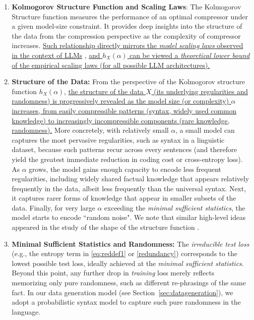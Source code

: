 \documentclass[11pt]{article}
\theoremstyle{plain}
\theoremstyle{definition}
\begin{document}
\begin{enumerate}
\item 
\noindent
{\bf  Kolmogorov Structure Function and Scaling Laws}:  
The Kolmogorov Structure function measures the performance of an optimal compressor under a given model-size constraint. It provides deep insights into the structure of the data from the compression perspective as the complexity of compressor increases. 
\uline{Such relationship directly mirrors the {\em model scaling laws} observed in the context of LLMs} \citep{kaplan2020scaling,hoffmann2022training}, \uline{and $h_X(\alpha)$ can be viewed a {\em theoretical lower bound} 
of the empirical scaling laws (for all possible LLM architectures).}


\item 
{\bf Structure of the Data:}  
From the perspective of the Kolmogorov structure function \(h_X(\alpha)\), 
\uline{the structure of the data $X$ (its underlying regularities and randomness)
is progressively revealed as the model size (or complexity) $\alpha$ increases, from easily compressible patterns (syntax, widely used common knowledge) to increasingly incompressible components (rare knowledge, randomness).}
More concretely, with relatively small 
\(\alpha\), a small model can captures the most pervasive regularities, such as syntax in a linguistic dataset, because such patterns recur across every sentences (and therefore yield the greatest immediate reduction in coding cost or cross-entropy loss). As \(\alpha\) grows, the model gains enough capacity to encode less frequent regularities, including widely shared factual knowledge that appears relatively frequently in the data, albeit less frequently than the universal syntax. Next, it captures rarer forms of knowledge that appear in smaller subsets of the data. Finally, for very large \(\alpha\) exceeding the {\em minimal sufficient statistics}, the model starts to encode  “random noise".
We note that similar high-level ideas appeared in the study of
the shape of the structure function
\citep{vereshchagin2004kolmogorov,rissanen2005kolmogorov,li2008introduction}.


\item 
{\bf Minimal Sufficient Statistics and Randomness: }
The \emph{irreducible test loss} (e.g., the entropy term in \eqref{eq:reddef1} or \eqref{redundancy}) 
corresponds to the lowest possible test loss, ideally achieved at the \emph{minimal sufficient statistics}. Beyond this point, any further drop in \emph{training} loss merely reflects memorizing only pure randomness, such as different re-phrasings of the same fact. In our data generation model (see Section~\ref{sec:datageneration}), we adopt a probabilistic syntax model to capture such pure randomness in the language.



\end{enumerate}
\end{document}
